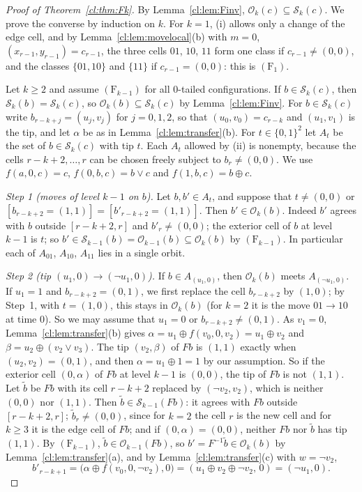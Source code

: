 \begin{proof}[Proof of Theorem~\ref{cl:thm:Fk}]
By Lemma~\ref{cl:lem:Finv}, $\mathcal O_k(c)\subseteq\mathcal S_k(c)$. We prove the converse by induction on $k$. For $k=1$, (i) allows only a change of the edge cell, and by Lemma~\ref{cl:lem:movelocal}(b) with $m=0$, $(x_{r-1},y_{r-1})=c_{r-1}$, the three cells $01$, $10$, $11$ form one class if $c_{r-1}\ne(0,0)$, and the classes $\{01,10\}$ and $\{11\}$ if $c_{r-1}=(0,0)$: this is $(\mathrm F_1)$.

Let $k\ge2$ and assume $(\mathrm F_{k-1})$ for all $0$-tailed configurations. If $b\in\mathcal S_k(c)$, then $\mathcal S_k(b)=\mathcal S_k(c)$, so $\mathcal O_k(b)\subseteq\mathcal S_k(c)$ by Lemma~\ref{cl:lem:Finv}. For $b\in\mathcal S_k(c)$ write $b_{r-k+j}=(u_j,v_j)$ for $j=0,1,2$, so that $(u_0,v_0)=c_{r-k}$ and $(u_1,v_1)$ is the tip, and let $\alpha$ be as in Lemma~\ref{cl:lem:transfer}(b). For $t\in\{0,1\}^2$ let $A_t$ be the set of $b\in\mathcal S_k(c)$ with tip $t$. Each $A_t$ allowed by (ii) is nonempty, because the cells $r-k+2,\dots,r$ can be chosen freely subject to $b_r\ne(0,0)$. We use $f(a,0,c)=c$, $f(0,b,c)=b\vee c$ and $f(1,b,c)=b\oplus c$.

\emph{Step 1 (moves of level $k-1$ on $b$).} Let $b,b'\in A_t$, and suppose that $t\ne(0,0)$ or $[b_{r-k+2}=(1,1)]=[b'_{r-k+2}=(1,1)]$. Then $b'\in\mathcal O_k(b)$. Indeed $b'$ agrees with $b$ outside $[r-k+2,r]$ and $b'_r\ne(0,0)$; the exterior cell of $b$ at level $k-1$ is $t$; so $b'\in\mathcal S_{k-1}(b)=\mathcal O_{k-1}(b)\subseteq\mathcal O_k(b)$ by $(\mathrm F_{k-1})$. In particular each of $A_{01}$, $A_{10}$, $A_{11}$ lies in a single orbit.

\emph{Step 2 (tip $(u_1,0)\to(\neg u_1,0)$).} If $b\in A_{(u_1,0)}$, then $\mathcal O_k(b)$ meets $A_{(\neg u_1,0)}$. If $u_1=1$ and $b_{r-k+2}=(0,1)$, we first replace the cell $b_{r-k+2}$ by $(1,0)$; by Step~1, with $t=(1,0)$, this stays in $\mathcal O_k(b)$ (for $k=2$ it is the move $01\to10$ at time $0$). So we may assume that $u_1=0$ or $b_{r-k+2}\ne(0,1)$. As $v_1=0$, Lemma~\ref{cl:lem:transfer}(b) gives $\alpha=u_1\oplus f(v_0,0,v_2)=u_1\oplus v_2$ and $\beta=u_2\oplus(v_2\vee v_3)$. The tip $(v_2,\beta)$ of $Fb$ is $(1,1)$ exactly when $(u_2,v_2)=(0,1)$, and then $\alpha=u_1\oplus1=1$ by our assumption. So if the exterior cell $(0,\alpha)$ of $Fb$ at level $k-1$ is $(0,0)$, the tip of $Fb$ is not $(1,1)$. Let $\tilde b$ be $Fb$ with its cell $r-k+2$ replaced by $(\neg v_2,v_2)$, which is neither $(0,0)$ nor $(1,1)$. Then $\tilde b\in\mathcal S_{k-1}(Fb)$: it agrees with $Fb$ outside $[r-k+2,r]$; $\tilde b_r\ne(0,0)$, since for $k=2$ the cell $r$ is the new cell and for $k\ge3$ it is the edge cell of $Fb$; and if $(0,\alpha)=(0,0)$, neither $Fb$ nor $\tilde b$ has tip $(1,1)$. By $(\mathrm F_{k-1})$, $\tilde b\in\mathcal O_{k-1}(Fb)$, so $b'=F^{-1}\tilde b\in\mathcal O_k(b)$ by Lemma~\ref{cl:lem:transfer}(a), and by Lemma~\ref{cl:lem:transfer}(c) with $w=\neg v_2$,
\[
b'_{r-k+1}=\bigl(\alpha\oplus f(v_0,0,\neg v_2),0\bigr)=(u_1\oplus v_2\oplus\neg v_2,\,0)=(\neg u_1,0).
\]


\end{proof}

